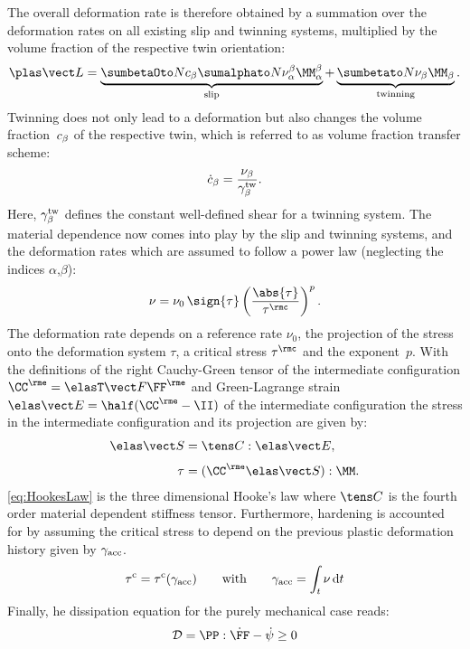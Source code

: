 The overall deformation rate is therefore obtained by a summation over the deformation rates on all existing slip and twinning systems, multiplied by the volume fraction of the respective twin orientation\supercite{kalidindi1998incorporation}:  
\begin{equation}
  \LLp = \underbrace{\sumbO \cb \sumaI \nuab \MMab}_{\text{slip}} + \underbrace{\sumbI \nub \MMb}_{\text{twinning}}.
\end{equation}
Twinning does not only lead to a deformation but also changes the volume fraction~$c_{\beta}$ of the respective twin, which is referred to as volume fraction transfer scheme:
\begin{align}
  \dot{c}_{\beta} = \frac{\nu_\beta}{\gamma^{\rm tw}_\beta}.
\end{align}
Here, $\gamma^{\rm tw}_\beta$ defines the constant well-defined shear for a twinning system. The material dependence now comes into play by the slip and twinning systems, and the deformation rates which are assumed to follow a power law (neglecting the indices $\alpha$,$\beta$):
\begin{align}
  \nu = \nu_0 \, \sign{\tau} \left( \frac{\abs{\tau}}{\tau^\rmc} \right)^{p}.
  \label{eq:powerlaw}
\end{align}
The deformation rate depends on a reference rate $\nu_0$, the projection of the stress onto the deformation system $\tau$, a critical stress $\tau^\rmc$ and the exponent~$p$. With the definitions of the right Cauchy-Green tensor of the intermediate configuration $\CCe=\FFeT\FFe$ and Green-Lagrange strain $\EEe=\half(\CCe-\II)$ of the intermediate configuration the stress in the intermediate configuration and its projection are given by:
\begin{align}
  \SSe &= \CCCC:\EEe,  \label{eq:HookesLaw} \\[3pt]
  \tau &= (\CCe\SSe):\MM.
\end{align}
\cref{eq:HookesLaw} is the three dimensional Hooke's law where $\CCCC$ is the fourth order material dependent stiffness tensor. Furthermore, hardening is accounted for by assuming the critical stress to depend on the previous plastic deformation history given by $\gamma_{\rm acc}$.
\begin{align}
  \tau^{\rm c} = \tau^{\rm c}(\gamma_{\rm acc}) \qquad \text{with} \qquad \gamma_{\rm acc} = \int_t \nu \, {\rm d} t
\end{align}
Finally, he dissipation equation for the purely mechanical case reads:
\begin{align} 
  \mathcal{D} = \PP:\dot\FF - \dot\psi \geq 0
\end{align}
